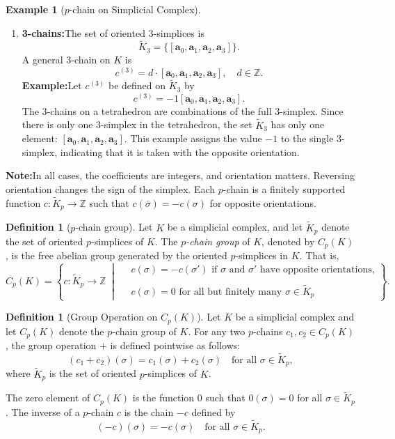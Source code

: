 \documentclass[12pt,oneside,reqno]{amsart}
\theoremstyle{plain}
\theoremstyle{definition}
\newtheorem{example}{Example}[section]
\newtheorem{definition}[theorem]{Definition}
\theoremstyle{remark}
\newcommand{\0}{{\textbf{0}}}
\begin{document}
\begin{example}[$p$-chain on Simplicial Complex]
\begin{enumerate}
\item \textbf{3-chains:}The set of oriented $3$-simplices is
\[
\widetilde{K}_3 = \{ [\mathbf{a}_0,\mathbf{a}_1,\mathbf{a}_2,\mathbf{a}_3] \}.
\]
A general $3$-chain on $K$ is
\[
c^{(3)} = d \cdot [\mathbf{a}_0,\mathbf{a}_1,\mathbf{a}_2,\mathbf{a}_3], \quad d \in \mathbb{Z}.
\]
\textbf{Example:}Let $c^{(3)}$ be defined on $\widetilde{K}_3$ by 
\[
c^{(3)} = -1 [\mathbf{a}_0,\mathbf{a}_1,\mathbf{a}_2,\mathbf{a}_3].
\]
The $3$-chains on a tetrahedron are combinations of the full 3-simplex. Since there is only one 3-simplex in the tetrahedron, the set $\widetilde{K}_3$ has only one element: $[\mathbf{a}_0,\mathbf{a}_1,\mathbf{a}_2,\mathbf{a}_3]$. This example assigns the value $-1$ to the single 3-simplex, indicating that it is taken with the opposite orientation. 
\end{enumerate}
\textbf{Note:}In all cases, the coefficients are integers, and orientation matters. Reversing orientation changes the sign of the simplex. Each $p$-chain is a finitely supported function $c \colon \widetilde{K}_p \to \mathbb{Z}$ such that $c(\bar{\sigma}) = -c(\sigma)$ for opposite orientations.
\end{example}


\begin{definition}[$p$-chain group]\label{def:p-chain-group}
Let $K$ be a simplicial complex, and let $\widetilde{K}_p$ denote the set of oriented $p$-simplices of $K$. The \emph{$p$-chain group} of $K$, denoted by $C_p(K)$, is the free abelian group generated by the oriented $p$-simplices in $K$. That is,
\[
C_p(K) = \left\{ c : \widetilde{K}_p \to \mathbb{Z} \;\middle|\;
\begin{aligned}
&c(\sigma) = -c(\sigma') \text{ if } \sigma \text{ and } \sigma' \text{ have opposite orientations,} \\\\
&c(\sigma) = 0 \text{ for all but finitely many } \sigma \in \widetilde{K}_p
\end{aligned}
\right\}.
\]
\end{definition}

\begin{definition}[Group Operation on $C_p(K)$]
Let $K$ be a simplicial complex and let $C_p(K)$ denote the $p$-chain group of $K$. For any two $p$-chains $c_1, c_2 \in C_p(K)$, the group operation $+$ is defined pointwise as follows:
\[
(c_1 + c_2)(\sigma) = c_1(\sigma) + c_2(\sigma) \quad \text{for all } \sigma \in \widetilde{K}_p,
\]
where $\widetilde{K}_p$ is the set of oriented $p$-simplices of $K$.

The zero element of $C_p(K)$ is the function $0$ such that $0(\sigma) = 0$ for all $\sigma \in \widetilde{K}_p$. The inverse of a $p$-chain $c$ is the chain $-c$ defined by
\[
(-c)(\sigma) = -c(\sigma) \quad \text{for all } \sigma \in \widetilde{K}_p.
\]
\end{definition}
\end{document}
